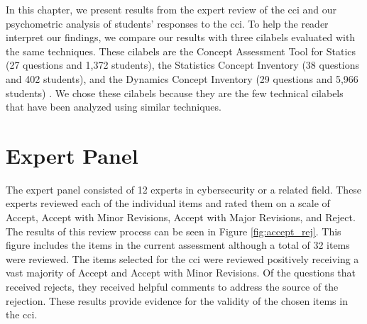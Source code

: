 

In this chapter, we present results from the expert review of the \gls{cci} and our psychometric analysis of students' responses to the \gls{cci}. To help the reader interpret our findings, we compare our results with three \glspl{cilabel} evaluated with the same techniques. These \glspl{cilabel} are the Concept Assessment Tool for Statics (27 questions and 1,372 students), the Statistics Concept Inventory (38 questions and 402 students), and the Dynamics Concept Inventory (29 questions and 5,966 students) \cite{jorian}. We chose these \glspl{cilabel} because they are the few technical \glspl{cilabel} that have been analyzed using similar techniques.






\section{Expert Panel}

The expert panel consisted of 12 experts in cybersecurity or a related field. These experts reviewed each of the individual items and rated them on a scale of Accept, Accept with Minor Revisions, Accept with Major Revisions, and Reject. The results of this review process can be seen in Figure \ref{fig:accept_rej}. This figure includes the items in the current assessment although a total of 32 items were reviewed. The items selected for the \gls{cci} were reviewed positively receiving a vast majority of Accept and Accept with Minor Revisions. Of the questions that received rejects, they received helpful comments to address the source of the rejection. These results provide evidence for the validity of the chosen items in the \gls{cci}.

